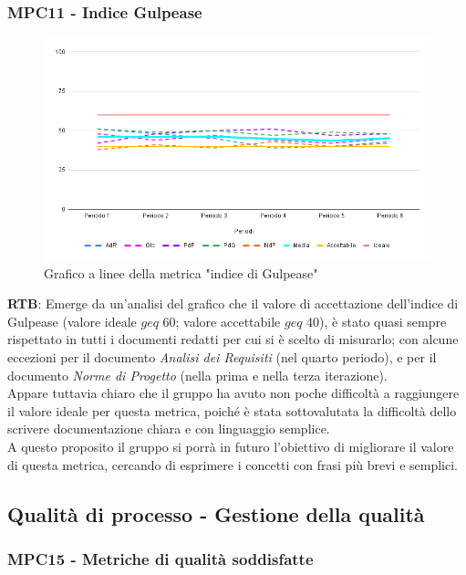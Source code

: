 \documentclass[10pt]{article}
\begin{document}
\begin{justify}
\subsubsection{MPC11 - Indice Gulpease}

\begin{figure}[H]
  \centering
  \includegraphics[width=0.9\linewidth]{gulpease.png}
  \caption{Grafico a linee della metrica "indice di Gulpease"}
  \label{fig:gulpease_chart}
\end{figure}

\textbf{RTB}: Emerge da un'analisi del grafico che il valore di accettazione dell'indice di Gulpease (valore ideale $geq$ 60; valore accettabile $geq$ 40), è stato quasi sempre rispettato in tutti i documenti
redatti per cui si è scelto di misurarlo; con alcune eccezioni per il documento \textit{Analisi dei Requisiti} (nel quarto periodo), e per il documento \textit{Norme di Progetto} (nella prima e nella terza iterazione).\\
Appare tuttavia chiaro che il gruppo ha avuto non poche difficoltà a raggiungere il valore ideale per questa metrica, poiché è stata sottovalutata la difficoltà dello 
scrivere documentazione chiara e con linguaggio semplice.\\
A questo proposito il gruppo si porrà in futuro l'obiettivo di migliorare il valore di questa metrica, cercando di esprimere i concetti con frasi più brevi e semplici.\\


\subsection{Qualità di processo - Gestione della qualità}
\subsubsection{MPC15 - Metriche di qualità soddisfatte}


\end{justify}
\end{document}
